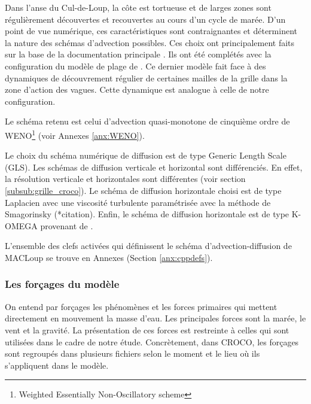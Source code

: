 \documentclass[10pt,a4paper,titlepage]{article}
\begin{document}
    Dans l'anse du Cul-de-Loup, la côte est tortueuse et de larges zones sont régulièrement découvertes et recouvertes au cours d'un cycle de marée.
    D'un point de vue numérique, ces caractéristiques sont contraignantes et déterminent la nature des schémas d'advection possibles.
    Ces choix ont principalement faits sur la base de la documentation principale \parencite{cppkeys_description}.
    Ils ont été complétés avec la configuration du modèle de plage de  \cite{swash_article_MARCHESIELLO2021101816}.
    Ce dernier modèle fait face à des dynamiques de découvrement régulier de certaines mailles de la grille dans la zone d'action des vagues.
    Cette dynamique est analogue à celle de notre configuration.
    
    Le schéma retenu est celui d'advection quasi-monotone de cinquième ordre de WENO\footnote{Weighted Essentially Non-Oscillatory scheme} (voir Annexes \ref{anx:WENO}).
    
    Le choix du schéma numérique de diffusion est de type Generic Length Scale (GLS).
    Les schémas de diffusion verticale et horizontal sont différenciés.
    En effet, la résolution verticale et horizontales sont différentes (voir section \ref{subsub:grille_croco}).
    Le schéma de diffusion horizontale choisi est de type Laplacien avec une viscosité turbulente paramétrisée avec la méthode de Smagorinsky \alert{(*citation)}.
    Enfin, le schéma de diffusion horizontale est de type K-OMEGA provenant de \cite{GLS_KOMEGA_kolmogorov1941equations}.
    
    L'ensemble des clefs activées qui définissent le schéma d'advection-diffusion de MACLoup se trouve en Annexes (Section \ref{anx:cppdefs}).
    
    
    \subsubsection{Les forçages du modèle}
    \label{subsub:forcages}
    On entend par forçages les phénomènes et les forces primaires qui mettent directement en mouvement la masse d'eau.
    Les principales forces sont la marée, le vent et la gravité.
    La présentation de ces forces est restreinte à celles qui sont utilisées dans le cadre de notre étude.
    Concrètement, dans CROCO, les forçages sont regroupés dans plusieurs fichiers selon le moment et le lieu où ils s'appliquent dans le modèle.
    
\end{document}
